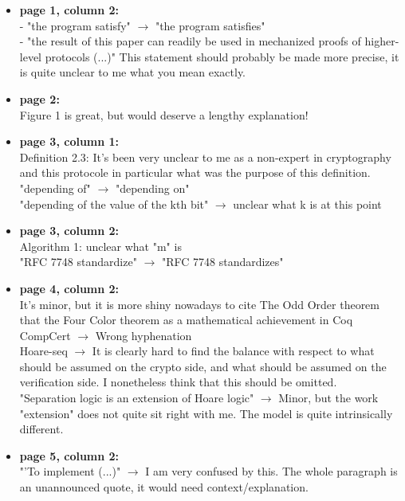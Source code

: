 \begin{itemize}
    \item \textbf{page 1, column 2:}\\
          - "the program satisfy" $\rightarrow$ "the program satisfies"\\
          - "the result of this paper can readily be used in mechanized proofs of higher-level protocols (...)"
          This statement should probably be made more precise, it is quite unclear to me what you mean exactly.

    \item \textbf{page 2:}\\
          Figure 1 is great, but would deserve a lengthy explanation!

    \item \textbf{page 3, column 1:}\\
          Definition 2.3: It's been very unclear to me as a non-expert in cryptography and this protocole in particular what was the purpose of this definition.\\
          "depending of" $\rightarrow$ "depending on"\\
          "depending of the value of the kth bit" $\rightarrow$ unclear what k is at this point

    \item \textbf{page 3, column 2:}\\
          Algorithm 1: unclear what "m" is\\
          "RFC 7748 standardize" $\rightarrow$   "RFC 7748 standardizes"

    \item \textbf{page 4, column 2:}\\
          It's minor, but it is more shiny nowadays to cite The Odd Order theorem that the Four Color theorem as a mathematical achievement in Coq\\
          CompCert $\rightarrow$ Wrong hyphenation\\
          Hoare-seq $\rightarrow$ It is clearly hard to find the balance with respect to what should be assumed on the crypto side, and what should be assumed on the verification side. I nonetheless think that this should be omitted.\\
          "Separation logic is an extension of Hoare logic" $\rightarrow$ Minor, but the work "extension" does not quite sit right with me. The model is quite intrinsically different.

    \item \textbf{page 5, column 2:}\\
          "'To implement (...)" $\rightarrow$ I am very confused by this. The whole paragraph is an unannounced quote, it would need context/explanation.


\end{itemize}
